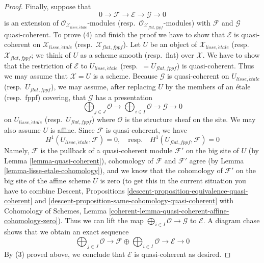\documentclass[10pt,a4paper]{amsart}
\theoremstyle{plain}
\theoremstyle{definition}
\theoremstyle{remark}
\numberwithin{equation}{subsection}
\def\etale{{\acute{e}tale}}
\begin{document}
\begin{proof}
\medskip\noindent
Finally, suppose that
$$
0 \to \mathcal{F} \to \mathcal{E} \to \mathcal{G} \to 0
$$
is an extension of $\mathcal{O}_{\mathcal{X}_{lisse,\etale}}$-modules
(resp.\ $\mathcal{O}_{\mathcal{X}_{flat,fppf}}$-modules) with $\mathcal{F}$
and $\mathcal{G}$ quasi-coherent. To prove (4) and finish the proof
we have to show that
$\mathcal{E}$ is quasi-coherent on $\mathcal{X}_{lisse,\etale}$
(resp.\ $\mathcal{X}_{flat,fppf}$). Let $U$
be an object of $\mathcal{X}_{lisse,\etale}$
(resp.\ $\mathcal{X}_{flat,fppf}$; we think of $U$ as a scheme smooth
(resp.\ flat) over $\mathcal{X}$. We have to show that the restriction
of $\mathcal{E}$ to $U_{lisse,\etale}$ (resp.\ $=U_{flat,fppf}$)
is quasi-coherent. Thus we may assume
that $\mathcal{X} = U$ is a scheme. Because $\mathcal{G}$
is quasi-coherent on $U_{lisse,\etale}$ (resp.\ $U_{flat,fppf}$),
we may assume, after replacing $U$ by the members
of an \'etale (resp.\ fppf) covering, that $\mathcal{G}$ has a
presentation
$$
\bigoplus\nolimits_{j \in J} \mathcal{O} \longrightarrow
\bigoplus\nolimits_{i \in I} \mathcal{O} \longrightarrow
\mathcal{G} \longrightarrow 0
$$
on $U_{lisse,\etale}$ (resp.\ $U_{flat,fppf}$) where $\mathcal{O}$
is the structure sheaf on the site. We may also assume $U$ is affine.
Since $\mathcal{F}$ is quasi-coherent, we have
$$
H^1(U_{lisse,\etale}, \mathcal{F}) = 0,
\quad\text{resp.}\quad
H^1(U_{flat,fppf}, \mathcal{F}) = 0
$$
Namely, $\mathcal{F}$ is the pullback of a quasi-coherent module
$\mathcal{F}'$ on the big site of $U$
(by Lemma \ref{lemma-quasi-coherent}), cohomology
of $\mathcal{F}$ and $\mathcal{F}'$ agree (by
Lemma \ref{lemma-lisse-etale-cohomology}), and we know that
the cohomology of $\mathcal{F}'$ on the big site of the affine scheme $U$
is zero (to get this in the current situation you have to
combine Descent, Propositions
\ref{descent-proposition-equivalence-quasi-coherent} and
\ref{descent-proposition-same-cohomology-quasi-coherent} with
Cohomology of Schemes, Lemma
\ref{coherent-lemma-quasi-coherent-affine-cohomology-zero}).
Thus we can lift the map
$\bigoplus_{i \in I} \mathcal{O} \to \mathcal{G}$
to $\mathcal{E}$. A diagram chase shows that we obtain
an exact sequence
$$
\bigoplus\nolimits_{j \in J} \mathcal{O} \to
\mathcal{F} \oplus \bigoplus\nolimits_{i \in I} \mathcal{O}
\to
\mathcal{E} \to 0
$$
By (3) proved above, we conclude that $\mathcal{E}$ is quasi-coherent
as desired.
\end{proof}
\end{document}

